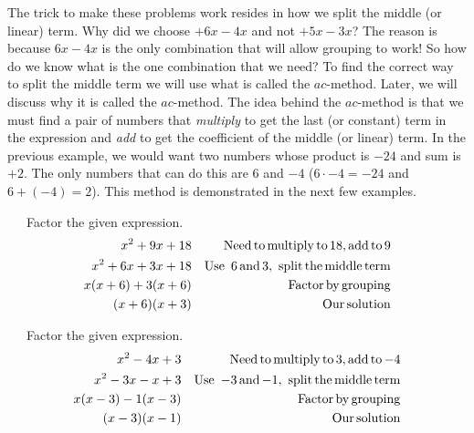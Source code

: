 The trick to make these problems work resides in how we split the middle (or linear) term. Why did
we choose $+ 6 x - 4 x$ and not $+ 5 x - 3 x$? The reason is because $6 x - 4 x$
is the only combination that will allow grouping to work!  So how do we know what is the one combination that we need? To find the correct way to split the middle term we will use what is called the $ac$-method. Later, we will discuss why
it is called the $ac$-method.\pp
The idea behind the $ac$-method is that we must find a pair of
numbers that \textit{multiply} to get the last (or constant) term in the expression and \textit{add} to get the coefficient of the middle (or linear) term.  In the previous example, we would want two numbers whose product is $- 24$ and sum is $+ 2$. The only numbers that can do this are $6$ and $-4$ ($6 \cdot - 4 = - 24$ and $6 + (- 4) = 2$). This method is demonstrated in
the next few examples.

\begin{example}~~~Factor the given expression.
  \begin{eqnarray*}
    x^2 + 9 x + 18 &  & \operatorname{Need} \operatorname{to} \operatorname{multiply} \operatorname{to} 18,
    \operatorname{add} \operatorname{to} 9\\
    x^2 + 6 x + 3 x + 18 &  & \operatorname{Use~}6 \operatorname{and} 3, \operatorname{~split} \operatorname{the}
    \operatorname{middle} \operatorname{term}\\
    x (x + 6) + 3 (x + 6) &  & \operatorname{Factor} \operatorname{by} \operatorname{grouping}\\
    (x + 6) (x + 3) &  & \operatorname{Our} \operatorname{solution}
  \end{eqnarray*}
\end{example}	
  

\begin{example}~~~Factor the given expression.
  \begin{eqnarray*}
    x^2 - 4 x + 3 &  & \operatorname{Need} \operatorname{to} \operatorname{multiply} \operatorname{to} 3,
    \operatorname{add} \operatorname{to} - 4\\
    x^2 - 3 x - x + 3 &  & \operatorname{Use~}- 3 \operatorname{and} - 1, \operatorname{~split} \operatorname{the}
    \operatorname{middle} \operatorname{term}\\
    x (x - 3) - 1 (x - 3) &  & \operatorname{Factor} \operatorname{by} \operatorname{grouping}\\
    (x - 3) (x - 1) &  & \operatorname{Our} \operatorname{solution}
  \end{eqnarray*}
\end{example}	
  

